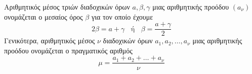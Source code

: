 Αριθμητικός μέσος τριών διαδοχικών όρων $ a,\beta,\gamma $ μιας αριθμητικής προόδου $ (a_\nu) $ ονομάζεται ο μεσαίος όρος $ \beta $ για τον οποίο έχουμε \[ 2\beta=a+\gamma\;\;\textrm{ ή }\;\;\beta=\frac{a+\gamma}{2} \]
Γενικότερα, αριθμητικός μέσος $ \nu $ διαδοχικών όρων $ a_1,a_2,\ldots,a_\nu $ μιας αριθμητικής προόδου ονομάζεται ο πραγματικός αριθμός \[ \mu=\frac{a_1+a_2+\ldots+a_\nu}{\nu} \]
